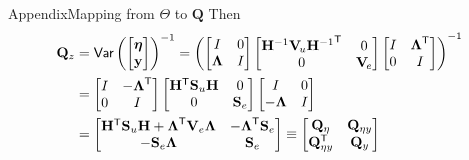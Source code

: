 \documentclass[xcolor=svgnames, 10pt, aspectratio=169]{beamer}
\newcommand\transpose[1]{{#1}^{\sf{T}}}
\begin{document}
\begin{frame}{Appendix}{Mapping from $\Theta$ to $\mathbf{Q}$}
Then 
\begin{align*}
    \mathbf{Q}_z 
    &= 
    \text{\sf{Var}}\left(
    \begin{bmatrix}
        \boldsymbol{\eta} \\
        \mathbf{y}
    \end{bmatrix}
    \right)^{-1} 
    =  
    \left(
    \begin{bmatrix}
        I & 0 \\
        \boldsymbol{\Lambda} & I
    \end{bmatrix}
    \begin{bmatrix}
        \mathbf{H}^{-1} \mathbf{V}_{\!u} \transpose{\mathbf{H}^{-1}} & 0 \\
        0 & \mathbf{V}_{\!e}
    \end{bmatrix} 
    \begin{bmatrix}
        I & \transpose{\boldsymbol{\Lambda}} \\
        0 & I
    \end{bmatrix}
    \right)^{-1}\\
    &=
    \begin{bmatrix}
        I & -\transpose{\boldsymbol{\Lambda}} \\
        0 & I
    \end{bmatrix}
    \begin{bmatrix}
        \transpose{\mathbf{H}} \mathbf{S}_{u} \mathbf{H} & 0 \\
        0 & \mathbf{S}_{e}
    \end{bmatrix} 
    \begin{bmatrix}
        I & 0 \\
        -\boldsymbol{\Lambda} & I 
    \end{bmatrix} \\
    &=
    \begin{bmatrix}
         \transpose{\mathbf{H}} \mathbf{S}_{u} \mathbf{H} + \transpose{\boldsymbol{\Lambda}}\mathbf{V}_{e}\boldsymbol{\Lambda}  & -\transpose{\boldsymbol{\Lambda}} \mathbf{S}_{e} \\
         -\mathbf{S}_{e} \boldsymbol{\Lambda} & \mathbf{S}_{e}
    \end{bmatrix}
    \equiv 
    \begin{bmatrix}
        \mathbf{Q}_{\eta} & \mathbf{Q}_{\eta y} \\
        \transpose{\mathbf{Q}}_{\eta y} & \mathbf{Q}_{y}  
    \end{bmatrix}
\end{align*}

\end{frame}
\end{document}
